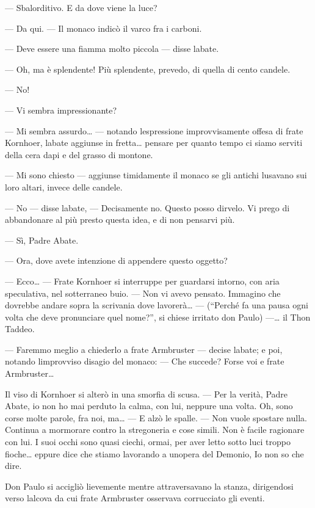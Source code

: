 --- Sbalorditivo. E da dove viene la luce?

--- Da qui. --- Il monaco indicò il varco fra i carboni.

--- Deve essere una fiamma molto piccola --- disse
l\textquotesingle abate.

--- Oh, ma è splendente! Più splendente, prevedo, di quella di cento
candele.

--- No!

--- Vi sembra impressionante?

--- Mi sembra assurdo\ldots{} --- notando l\textquotesingle espressione
improvvisamente offesa di frate Kornhoer, l\textquotesingle abate
aggiunse in fretta\ldots{} pensare per quanto tempo ci siamo serviti
della cera d\textquotesingle api e del grasso di montone.

--- Mi sono chiesto --- aggiunse timidamente il monaco se gli antichi
l\textquotesingle usavano sui loro altari, invece delle candele.

--- No --- disse l\textquotesingle abate, --- Decisamente no. Questo
posso dirvelo. Vi prego di abbandonare al più presto questa idea, e di
non pensarvi più.

--- Sì, Padre Abate.

--- Ora, dove avete intenzione di appendere questo oggetto?

--- Ecco\ldots{} --- Frate Kornhoer si interruppe per guardarsi intorno,
con aria speculativa, nel sotterraneo buio. --- Non vi avevo pensato.
Immagino che dovrebbe andare sopra la scrivania dove lavorerà\ldots{}
--- (``Perché fa una pausa ogni volta che deve pronunciare quel nome?'',
si chiese irritato don Paulo) ---\ldots{} il Thon Taddeo.

--- Faremmo meglio a chiederlo a frate Armbruster --- decise
l\textquotesingle abate; e poi, notando l\textquotesingle improvviso
disagio del monaco: --- Che succede? Forse voi e frate
Armbruster\ldots{}

Il viso di Kornhoer si alterò in una smorfia di scusa. --- Per la
verità, Padre Abate, io non ho mai perduto la calma, con lui, neppure
una volta. Oh, sono corse molte parole, fra noi, ma\ldots{} --- E alzò
le spalle. --- Non vuole spostare nulla. Continua a mormorare contro la
stregoneria e cose simili. Non è facile ragionare con lui. I suoi occhi
sono quasi ciechi, ormai, per aver letto sotto luci troppo
fioche\ldots{} eppure dice che stiamo lavorando a
un\textquotesingle opera del Demonio, Io non so che dire.

Don Paulo si accigliò lievemente mentre attraversavano la stanza,
dirigendosi verso l\textquotesingle alcova da cui frate Armbruster
osservava corrucciato gli eventi.

